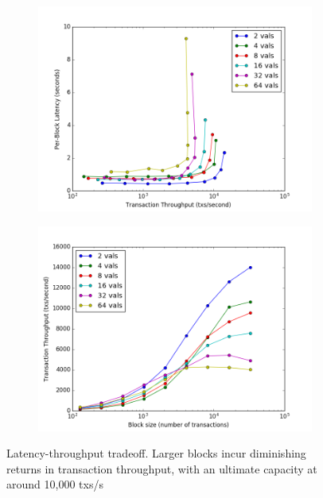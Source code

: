 \begin{figure}[]
	\centering
	\begin{subfigure}{0.8 \textwidth}
		\includegraphics[width=\linewidth,height=\textheight,keepaspectratio]{figures/throughput/latency-throughput.png}
	\end{subfigure}

	\begin{subfigure}{0.8 \textwidth}
		\includegraphics[width=\linewidth,height=\textheight,keepaspectratio]{figures/throughput/throughput-blocksize.png}
	\end{subfigure}
	\centering
	\caption[Latency-Throughput tradeoff in non-faulty global network]{Latency-throughput tradeoff.
Larger blocks incur diminishing 
returns in transaction throughput, with an ultimate capacity at around 10,000 txs/s}
	\label{fig:exp:throughput}
\end{figure}

